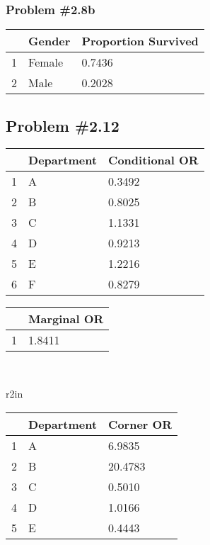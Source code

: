 \documentclass[12pt, letterpaper]{article}
\begin{document}
\subsubsection*{Problem {\#}2.8b}
\begin{table}[ht]
	\centering
	\begin{tabular}{rll}
		\hline
		& Gender & Proportion Survived \\ 
		\hline
		1 & Female & 0.7436 \\ 
		2 & Male & 0.2028 \\ 
		\hline
	\end{tabular}
\end{table}

\newpage 
\subsection*{Problem {\#}2.12}  
	\begin{tabular}{rll}
		\hline
		& Department & Conditional OR \\ 
		\hline
		1 & A & 0.3492 \\ 
		2 & B & 0.8025 \\ 
		3 & C & 1.1331 \\ 
		4 & D & 0.9213 \\ 
		5 & E & 1.2216 \\ 
		6 & F & 0.8279 \\ 
		\hline
	\end{tabular}
\hfill 
	\begin{tabular}{rl}
		\hline
		& Marginal OR \\ 
		\hline
		1 & 1.8411 \\ 
		\hline
	\end{tabular}
\hfill \phant \\

\begin{wraptable}{r}{2in}
	\vspace{-24pt} 
	\begin{tabular}{rll}
		\hline
		& Department & Corner OR \\ 
		\hline
		1 & A & 6.9835 \\ 
		2 & B & 20.4783 \\ 
		3 & C & 0.5010 \\ 
		4 & D & 1.0166 \\ 
		5 & E & 0.4443 \\ 
		\hline
	\end{tabular}
\end{wraptable}
\end{document}
